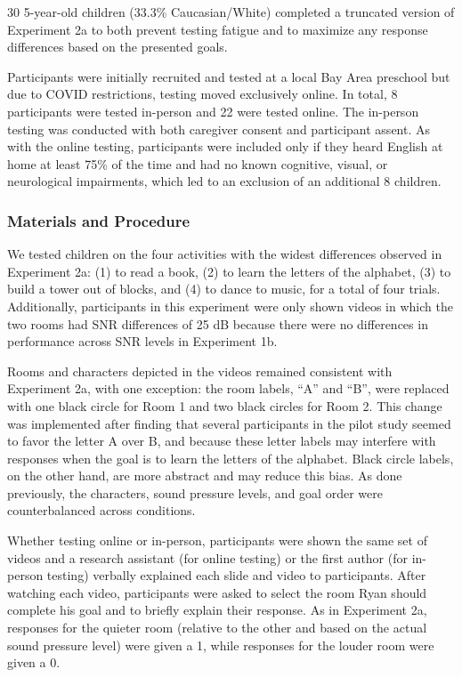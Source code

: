 \documentclass[10pt, letterpaper]{article}
\begin{document}
30 5-year-old children (33.3\% Caucasian/White) completed a truncated
version of Experiment 2a to both prevent testing fatigue and to maximize
any response differences based on the presented goals.

Participants were initially recruited and tested at a local Bay Area
preschool but due to COVID restrictions, testing moved exclusively
online. In total, 8 participants were tested in-person and 22 were
tested online. The in-person testing was conducted with both caregiver
consent and participant assent. As with the online testing, participants
were included only if they heard English at home at least 75\% of the
time and had no known cognitive, visual, or neurological impairments,
which led to an exclusion of an additional 8 children.

\hypertarget{materials-and-procedure-3}{%
\subsubsection{Materials and
Procedure}\label{materials-and-procedure-3}}

We tested children on the four activities with the widest differences
observed in Experiment 2a: (1) to read a book, (2) to learn the letters
of the alphabet, (3) to build a tower out of blocks, and (4) to dance to
music, for a total of four trials. Additionally, participants in this
experiment were only shown videos in which the two rooms had SNR
differences of 25 dB because there were no differences in performance
across SNR levels in Experiment 1b.

Rooms and characters depicted in the videos remained consistent with
Experiment 2a, with one exception: the room labels, ``A'' and ``B'',
were replaced with one black circle for Room 1 and two black circles for
Room 2. This change was implemented after finding that several
participants in the pilot study seemed to favor the letter A over B, and
because these letter labels may interfere with responses when the goal
is to learn the letters of the alphabet. Black circle labels, on the
other hand, are more abstract and may reduce this bias. As done
previously, the characters, sound pressure levels, and goal order were
counterbalanced across conditions.

Whether testing online or in-person, participants were shown the same
set of videos and a research assistant (for online testing) or the first
author (for in-person testing) verbally explained each slide and video
to participants. After watching each video, participants were asked to
select the room Ryan should complete his goal and to briefly explain
their response. As in Experiment 2a, responses for the quieter room
(relative to the other and based on the actual sound pressure level)
were given a 1, while responses for the louder room were given a 0.
\end{document}
